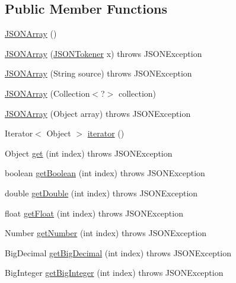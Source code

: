 \subsection*{Public Member Functions}
\begin{DoxyCompactItemize}
\item 
\hyperlink{classorg_1_1json_1_1JSONArray_abf6f4be98df2bcc1fa7e08881bf1accd}{J\-S\-O\-N\-Array} ()
\item 
\hyperlink{classorg_1_1json_1_1JSONArray_a9e8972d5f64b8fc6b7fca9169d29421a}{J\-S\-O\-N\-Array} (\hyperlink{classorg_1_1json_1_1JSONTokener}{J\-S\-O\-N\-Tokener} x)  throws J\-S\-O\-N\-Exception 
\item 
\hyperlink{classorg_1_1json_1_1JSONArray_a62861e8a8afbae3fd6b637aeb444b2d4}{J\-S\-O\-N\-Array} (String source)  throws J\-S\-O\-N\-Exception 
\item 
\hyperlink{classorg_1_1json_1_1JSONArray_a505a06836395ebc2460da84902b1b645}{J\-S\-O\-N\-Array} (Collection$<$?$>$ collection)
\item 
\hyperlink{classorg_1_1json_1_1JSONArray_a22e9287f807d9846f4cb7d4bd300f2eb}{J\-S\-O\-N\-Array} (Object array)  throws J\-S\-O\-N\-Exception 
\item 
Iterator$<$ Object $>$ \hyperlink{classorg_1_1json_1_1JSONArray_a606636d5a55ac4d0783ac5308cdd6e19}{iterator} ()
\item 
Object \hyperlink{classorg_1_1json_1_1JSONArray_a3a8413753f53e0c0a5e008816c915eae}{get} (int index)  throws J\-S\-O\-N\-Exception 
\item 
boolean \hyperlink{classorg_1_1json_1_1JSONArray_ac7b9da6fc6276ca0211a5bfb80d0f059}{get\-Boolean} (int index)  throws J\-S\-O\-N\-Exception 
\item 
double \hyperlink{classorg_1_1json_1_1JSONArray_a1cd0e0c302e4acfe0393e6fbbc9a1c72}{get\-Double} (int index)  throws J\-S\-O\-N\-Exception 
\item 
float \hyperlink{classorg_1_1json_1_1JSONArray_af10a8724d6b2b77ec99e834f2a675d1a}{get\-Float} (int index)  throws J\-S\-O\-N\-Exception 
\item 
Number \hyperlink{classorg_1_1json_1_1JSONArray_afea94e2d9ced169765099b47fee63972}{get\-Number} (int index)  throws J\-S\-O\-N\-Exception 
\item 
Big\-Decimal \hyperlink{classorg_1_1json_1_1JSONArray_acac68b0bc223217f0e828da681f96421}{get\-Big\-Decimal} (int index)  throws J\-S\-O\-N\-Exception 
\item 
Big\-Integer \hyperlink{classorg_1_1json_1_1JSONArray_a64786a16ade2290e58a230e203897dfc}{get\-Big\-Integer} (int index)  throws J\-S\-O\-N\-Exception 

\end{DoxyCompactItemize}
